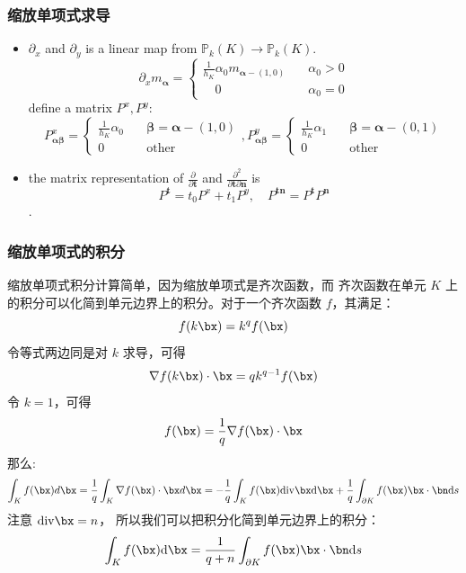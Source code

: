 \documentclass[notheorems,serif]{beamer}
\begin{document}
\begin{frame}
  \frametitle{缩放单项式求导}
  \begin{itemize}
      \item $\partial_x$ and $\partial_y$ is a linear map from $\mathbb{P}_k(K) \to
          \mathbb{P}_k(K)$.
          $$
          \partial_x m_{ \boldsymbol \alpha} = 
            \begin{cases}
            \frac{1}{h_K}\alpha_0 m_{\boldsymbol \alpha-(1, 0)} \quad & \alpha_0 > 0\\
            \quad 0 & \alpha_0 = 0
            \end{cases}
          $$
          define a matrix $P^x, P^y$:
          $$
          P_{\boldsymbol{\alpha\beta}}^x =
            \begin{cases}
            \frac{1}{h_K}\alpha_0 \quad & \boldsymbol \beta = \boldsymbol \alpha - (1, 0)\\
             0 & \mathrm{other}
         \end{cases},
            P^y_{ \boldsymbol{\alpha\beta}} =
            \begin{cases}
            \frac{1}{h_K}\alpha_1 \quad & \boldsymbol \beta = \boldsymbol \alpha - (0, 1)\\
             0 & \mathrm{other}
            \end{cases}
          $$
      \item the matrix representation of $\frac{\partial }{\partial
          \boldsymbol{t}}$ and $\frac{\partial^2 }{\partial
          \boldsymbol{t}\partial \boldsymbol{n}}$ is
          $$
          P^{\boldsymbol{t}} = t_0 P^x + t_1 P^y, \quad 
          P^{\boldsymbol{t}\boldsymbol{n}}= P^{\boldsymbol{t}}P^{\boldsymbol{n}}
          $$.
  \end{itemize}


\end{frame}

\begin{frame}
  \frametitle{缩放单项式的积分}
缩放单项式积分计算简单，因为缩放单项式是齐次函数，而
齐次函数在单元 $K$ 上的积分可以化简到单元边界上的积分。对于一个齐次函数 
$f$，其满足：
$$
f(k \bx) = k^q f(\bx)
$$
令等式两边同是对 $k$ 求导，可得
$$
\nabla f(k \bx)\cdot \bx = q k^{q-1} f(\bx)
$$
令 $k = 1$，可得
$$
f(\bx) = \frac{1}{q} \nabla f(\bx)\cdot \bx
$$
那么:
$$
\int_K f(\bx)d\bx = \frac{1}{q} \int_{K}
\nabla f(\bx)\cdot \bx d\bx
= -\frac{1}{q} \int_{K} f(\bx)\mathrm{div}{\bx}
\mathrm{d}\bx
+ \frac{1}{q} \int_{\partial K} f(\bx)\bx\cdot
\bn\mathrm{d}s
$$
注意 $\mathrm{div}{\bx} = n$，
所以我们可以把积分化简到单元边界上的积分：
$$
\int_K f(\bx)\mathrm{d}\bx = \frac{1}{q+n} \int_{\partial K}
f(\bx)\bx\cdot \bn\mathrm{d}s
$$
\end{frame}
\end{document}
